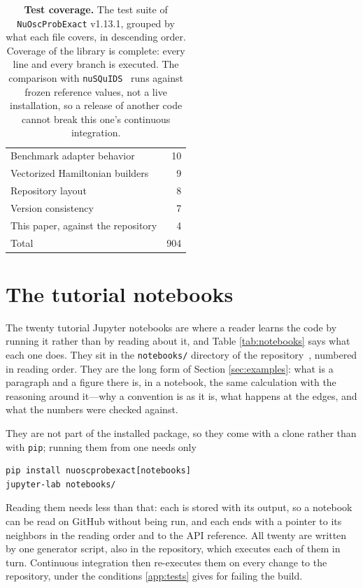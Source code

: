 \documentclass[final,5p,times,twocolumn,sort,compress]{elsarticle}
\begin{document}
{\begin{table}[t!]
\begin{tabular}{lr}
   Benchmark adapter behavior               & 10 \\
   Vectorized Hamiltonian builders          & 9 \\
   Repository layout                        & 8 \\
   Version consistency                      & 7 \\
   This paper, against the repository       & 4 \\
   \hline
   Total                                    & 904 \\
  \end{tabular}
  \caption{\label{tab:tests}{\bf Test coverage.} The test suite of {\tt NuOscProbExact} v1.13.1, grouped by what each file covers, in descending order.  Coverage of the library is complete: every line and every branch is executed.  The comparison with {\tt nuSQuIDS}\ \cite{Delgado:2014kpa, NuSQuIDS} runs against frozen reference values, not a live installation, so a release of another code cannot break this one's continuous integration.}
\end{table}
}


\section{The tutorial notebooks}
\label{app:notebooks}
\appresetfloats

The twenty tutorial Jupyter notebooks are where a reader learns the code by running it rather than by reading about it, and Table \ref{tab:notebooks} says what each one does.  They sit in the {\tt notebooks/} directory of the repository\ \cite{NuOscProbExact}, numbered in reading order.  They are the long form of Section \ref{sec:examples}: what is a paragraph and a figure there is, in a notebook, the same calculation with the reasoning around it---why a convention is as it is, what happens at the edges, and what the numbers were checked against.

They are not part of the installed package, so they come with a clone rather than with {\tt pip}; running them from one needs only
\begin{verbatim}
pip install nuoscprobexact[notebooks]
jupyter-lab notebooks/
\end{verbatim}
Reading them needs less than that: each is stored with its output, so a notebook can be read on GitHub without being run, and each ends with a pointer to its neighbors in the reading order and to the API reference.  All twenty are written by one generator script, also in the repository, which executes each of them in turn.  Continuous integration then re-executes them on every change to the repository, under the conditions \ref{app:tests} gives for failing the build.
\end{document}
